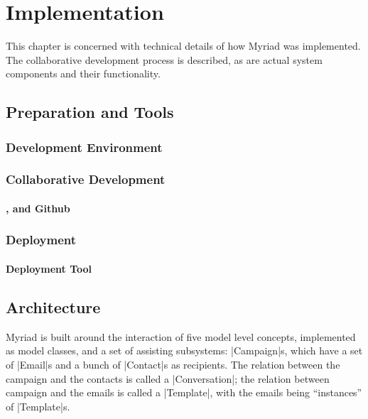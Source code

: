 \chapter{Implementation}
\label{chapter:Implementation}

This chapter is concerned with technical details of how Myriad was implemented. The collaborative development process is described, as are actual system components and their functionality.

\section{Preparation and Tools}


\subsection{Development Environment}



\subsection{Collaborative Development}



\subsubsection{,  and Github}



\subsection{Deployment}
\label{subsection:Deployment}



\subsubsection{Deployment Tool }



\section{Architecture}
\label{sec:Architecture}

Myriad is built around the interaction of five model level concepts, implemented as model classes, and a set of assisting subsystems:
|Campaign|s, which have a set of |Email|s and a bunch of |Contact|s as recipients. The relation between the campaign and the contacts is called a |Conversation|; the relation between campaign and the emails is called a |Template|, with the emails being ``instances'' of |Template|s.

